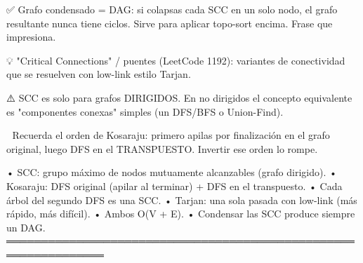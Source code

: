 \begin{dsaentrevistas}

✅ Grafo condensado = DAG: si colapsas cada SCC en un solo nodo, el
   grafo resultante nunca tiene ciclos. Sirve para aplicar topo-sort
   encima. Frase que impresiona.

💡 "Critical Connections" / puentes (LeetCode 1192): variantes de
   conectividad que se resuelven con low-link estilo Tarjan.

⚠️ SCC es solo para grafos DIRIGIDOS. En no dirigidos el concepto
   equivalente es "componentes conexas" simples (un DFS/BFS o Union-Find).

🔑 Recuerda el orden de Kosaraju: primero apilas por finalización en el
   grafo original, luego DFS en el TRANSPUESTO. Invertir ese orden lo
   rompe.

\end{dsaentrevistas}

\begin{dsaresumen}

• SCC: grupo máximo de nodos mutuamente alcanzables (grafo dirigido).
• Kosaraju: DFS original (apilar al terminar) + DFS en el transpuesto.
• Cada árbol del segundo DFS es una SCC.
• Tarjan: una sola pasada con low-link (más rápido, más difícil).
• Ambos O(V + E).
• Condensar las SCC produce siempre un DAG.
════════════════════════════════════════════════════════════════

\end{dsaresumen}
